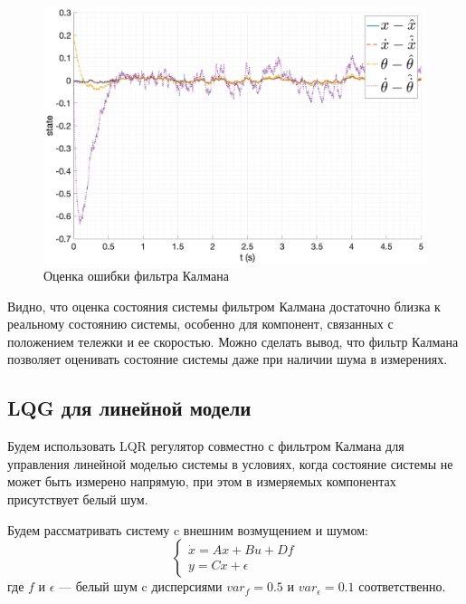 \begin{figure}[ht!]
    \centering
    \includegraphics[width=\textwidth]{media/plots/kalman/observer_err_1.png}
    \caption{Оценка ошибки фильтра Калмана}
    \label{fig:kalman_filter_err}
\end{figure}

Видно, что оценка состояния системы фильтром Калмана достаточно близка к реальному состоянию системы, особенно для 
компонент, связанных с положением тележки и ее скоростью. Можно сделать вывод, что фильтр Калмана позволяет оценивать 
состояние системы даже при наличии шума в измерениях. 


\FloatBarrier
\subsection{LQG для линейной модели}
Будем использовать LQR регулятор совместно с фильтром Калмана для управления линейной моделью системы в 
условиях, когда состояние системы не может быть измерено напрямую, при этом в измеряемых компонентах присутствует 
белый шум. 

Будем рассматривать систему c внешним возмущением и шумом: 
\begin{equation}
    \begin{cases}
        \dot{x} = Ax + Bu + Df \\ 
        y = Cx + \epsilon
    \end{cases}
\end{equation}
где $f$ и $\epsilon$ --- белый шум c дисперсиями $var_f = 0.5$ и $var_\epsilon = 0.1$ соответственно.

